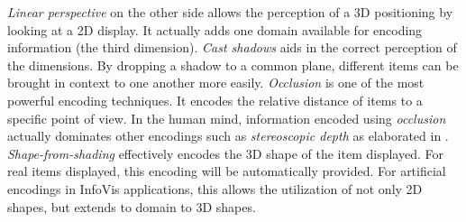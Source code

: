 \emph{Linear perspective} on the other side allows the perception of a 3D positioning by looking at a 2D display. It actually adds one domain available for encoding information (the third dimension). \emph{Cast shadows} aids in the correct perception of the dimensions. By dropping a shadow to a common plane, different items can be brought in context to one another more easily. \emph{Occlusion} is one of the most powerful encoding techniques. It encodes the relative distance of items to a specific point of view. In the human mind, information encoded using \emph{occlusion} actually dominates other encodings such as \emph{stereoscopic depth} as elaborated in \cite{Ware2004}. \emph{Shape-from-shading} effectively encodes the 3D shape of the item displayed. For real items displayed, this encoding will be automatically provided. For artificial encodings in InfoVis applications, this allows the utilization of not only 2D shapes, but extends to domain to 3D shapes.
